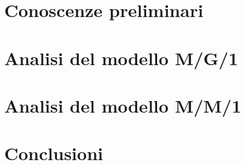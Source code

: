 \clearpage{\pagestyle{plain}\cleardoublepage} %
\chapter{Conoscenze preliminari} %
\label{cap:con-prel} %

\clearpage{\pagestyle{plain}\cleardoublepage} %
\chapter{Analisi del modello M/G/1} %
\label{cap:MG1} %

\clearpage{\pagestyle{plain}\cleardoublepage} %
\chapter{Analisi del modello M/M/1} %
\label{cap:MM1} %

\clearpage{\pagestyle{plain}\cleardoublepage} %
\chapter{Conclusioni} %
\label{cap:conclusioni} %

\clearpage{\pagestyle{plain}\cleardoublepage}
\nocite{*}
\printbibliography[heading=bibintoc]



